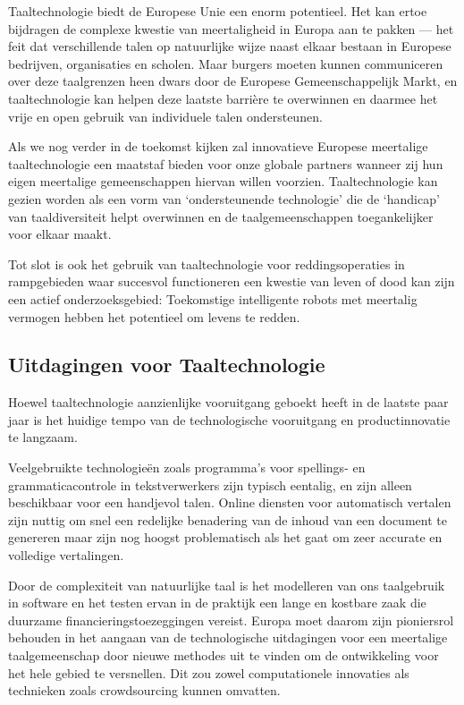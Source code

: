 \documentclass[]{../../metanetpaper}
\begin{document}
\begin{multicols}{2}

    Taaltechnologie biedt de Europese Unie een enorm potentieel. Het kan ertoe bijdragen de complexe kwestie van meertaligheid in Europa aan te pakken --- het feit dat verschillende talen op natuurlijke wijze naast elkaar bestaan in Europese bedrijven, organisaties en scholen. Maar burgers moeten kunnen communiceren over deze taalgrenzen heen dwars door de Europese Gemeenschappelijk Markt, en taaltechnologie kan helpen deze laatste barri{\`e}re te overwinnen en daarmee het vrije en open gebruik van individuele talen ondersteunen.

Als we nog verder in de toekomst kijken zal innovatieve Europese meertalige taaltechnologie een maatstaf bieden voor onze globale partners wanneer zij hun eigen meertalige gemeenschappen hiervan willen voorzien. Taaltechnologie kan gezien worden als een vorm van `ondersteunende technologie' die de `handicap' van taaldiversiteit helpt overwinnen en de taalgemeenschappen toegankelijker voor elkaar maakt.

  Tot slot is ook het gebruik van taaltechnologie voor reddingsoperaties in rampgebieden waar succesvol functioneren een kwestie van leven of dood kan zijn een actief onderzoeksgebied: Toekomstige intelligente robots met meertalig vermogen hebben het potentieel om levens te redden.

\subsection{Uitdagingen voor Taaltechnologie}

Hoewel taaltechnologie aanzienlijke vooruitgang geboekt heeft in de laatste paar jaar is het huidige tempo van de technologische vooruitgang en productinnovatie te langzaam.


Veelgebruikte technologie{\"e}n zoals programma's voor spellings- en grammaticacontrole in tekstverwerkers zijn typisch eentalig, en zijn alleen beschikbaar voor een handjevol talen. Online diensten voor automatisch vertalen zijn nuttig om snel een redelijke benadering van de inhoud van een document te genereren maar zijn nog hoogst problematisch als het gaat om zeer accurate en volledige vertalingen.

Door de complexiteit van natuurlijke taal is het modelleren van ons taalgebruik in software en het testen ervan in de praktijk een lange en kostbare zaak die duurzame financieringstoezeggingen vereist. Europa moet daarom zijn pioniersrol behouden in het aangaan van de technologische uitdagingen voor een meertalige taalgemeenschap door nieuwe methodes uit te vinden om de ontwikkeling voor het hele gebied te versnellen. Dit zou zowel computationele innovaties als technieken zoals crowdsourcing kunnen omvatten.


\end{multicols}
\end{document}
